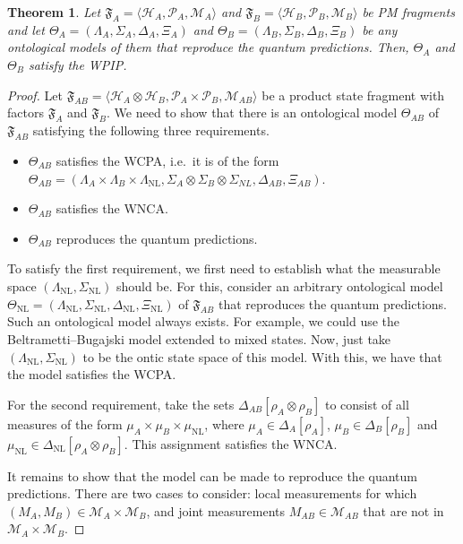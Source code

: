 \documentclass[DIV=calc,fontsize=12pt]{scrartcl} %
\theoremstyle{definition}
\theoremstyle{plain}
\newtheorem{theorem}[definition]{Theorem}
\newcommand{\Hilb}[1][]{\ensuremath{\mathcal{H}_{#1}}}
\begin{document}
\begin{theorem}
\label{thm:CCPA:reprod}
Let $\mathfrak{F}_A = \langle \Hilb[A], \mathcal{P}_A, \mathcal{M}_A
\rangle$ and $\mathfrak{F}_B = \langle \Hilb[B], \mathcal{P}_B,
\mathcal{M}_B \rangle$ be PM fragments and let $\Theta_A =
(\Lambda_A, \Sigma_A, \Delta_A, \Xi_A )$ and $\Theta_B = (\Lambda_B,
\Sigma_B, \Delta_B, \Xi_B)$ be any ontological models of them that
reproduce the quantum predictions.  Then, $\Theta_A$ and $\Theta_B$
satisfy the WPIP.
\end{theorem}
\begin{proof}
Let $\mathfrak{F}_{AB} = \langle \Hilb[A] \otimes \Hilb[B],
\mathcal{P}_A \times \mathcal{P}_B, \mathcal{M}_{AB} \rangle$ be a
product state fragment with factors $\mathfrak{F}_A$ and
$\mathfrak{F}_B$.  We need to show that there is an ontological
model $\Theta_{AB}$ of $\mathfrak{F}_{AB}$ satisfying the following
three requirements.
\begin{itemize}
\item $\Theta_{AB}$ satisfies the WCPA, i.e.\ it is of the form
$\Theta_{AB} = (\Lambda_A \times \Lambda_B \times
\Lambda_{\text{NL}}, \Sigma_A \otimes \Sigma_B \otimes
\Sigma_{NL}, \Delta_{AB}, \Xi_{AB})$.
\item $\Theta_{AB}$ satisfies the WNCA.
\item $\Theta_{AB}$ reproduces the quantum predictions.
\end{itemize}

To satisfy the first requirement, we first need to establish what
the measurable space $(\Lambda_{\text{NL}}, \Sigma_{\text{NL}})$
should be.  For this, consider an arbitrary ontological model
$\Theta_{\text{NL}} = ( \Lambda_{\text{NL}}, \Sigma_{\text{NL}},
\Delta_{\text{NL}}, \Xi_{\text{NL}})$ of $\mathfrak{F}_{AB}$ that
reproduces the quantum predictions.  Such an ontological model
always exists.  For example, we could use the Beltrametti--Bugajski
model extended to mixed states.  Now, just take
$(\Lambda_{\text{NL}}, \Sigma_{\text{NL}})$ to be the ontic state
space of this model.  With this, we have that the model satisfies
the WCPA.

For the second requirement, take the sets $\Delta_{AB}[\rho_A
\otimes \rho_B]$ to consist of all measures of the form $\mu_A
\times \mu_B \times \mu_{\text{NL}}$, where $\mu_A \in
\Delta_A[\rho_A]$, $\mu_B \in \Delta_B[\rho_B]$ and $\mu_{\text{NL}}
\in \Delta_{\text{NL}}[\rho_A \otimes \rho_B]$.  This assignment
satisfies the WNCA.

It remains to show that the model can be made to reproduce the
quantum predictions.  There are two cases to consider: local
measurements for which $(M_A,M_B) \in \mathcal{M}_A \times
\mathcal{M}_B$, and joint measurements $M_{AB} \in \mathcal{M}_{AB}$
that are not in $\mathcal{M}_A \times \mathcal{M}_B$.


\end{proof}
\end{document}
